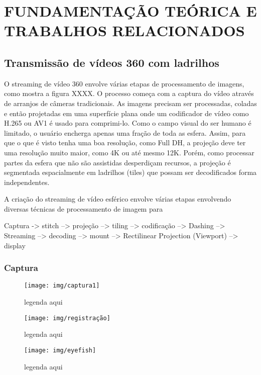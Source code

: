 
\chapter{FUNDAMENTAÇÃO TEÓRICA E TRABALHOS RELACIONADOS}\label{Cap:Foundations}

\section{Transmissão de vídeos 360 com ladrilhos}

O streaming de vídeo 360 envolve várias etapas de processamento de imagens, como mostra a figura XXXX. O processo começa com a captura do vídeo através de arranjos de câmeras tradicionais. As imagens precisam ser processadas, coladas e então projetadas em uma superfície plana onde um codificador de vídeo como H.265 ou AV1 é usado para comprimi-lo. Como o campo visual do ser humano é limitado, o usuário encherga apenas uma fração de toda as esfera. Assim, para que o que é visto tenha uma boa resolução, como Full DH, a projeção deve ter uma resolução muito maior, como 4K ou até mesmo 12K. Porém, como processar partes da esfera que não são assistidas desperdiçam recursos, a projeção é segmentada espacialmente em ladrilhos (tiles) que possam ser decodificados forma independentes.

A criação do streaming de vídeo esférico envolve várias etapas envolvendo diversas técnicas de processamento de imagem para

Captura -> stitch --> projeção --> tiling --> codificação -->  Dashing --> Streaming --> decoding --> mount --> Rectilinear Projection (Viewport) --> display

\subsection{Captura}

\begin{figure}[tbh]
	\centering
	\texttt{[image: img/captura1]}
	\caption{legenda aqui}
	\label{fig:captura1}
\end{figure}

\begin{figure}[tbh]
	\centering
	\texttt{[image: img/registração]}
	\caption{legenda aqui}
	\label{fig:registracao}
\end{figure}

\begin{figure}[tbh]
	\centering
	\texttt{[image: img/eyefish]}
	\caption{legenda aqui}
	\label{fig:eyefish}
\end{figure}

